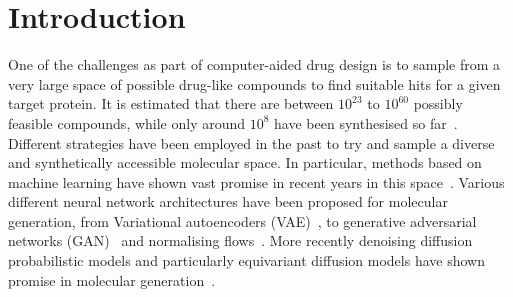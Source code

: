 \documentclass[journal=jacsat,manuscript=article]{achemso}
\begin{document}
\section{Introduction}
\label{sec:intro}
One of the challenges as part of computer-aided drug design is to sample from a very large space of possible drug-like compounds to find suitable hits for a given target protein. It is estimated that there are between $10^{23}$ to $10^{60}$ possibly feasible compounds, while only around $10^8$ have been synthesised so far~\cite{polishchuk2013estimation, reymond2012exploring}. Different strategies have been employed in the past to try and sample a diverse and synthetically accessible molecular space. In particular, methods based on machine learning have shown vast promise in recent years in this space~\cite{bilodeau2022generative}. Various different neural network architectures have been proposed for molecular generation, from Variational autoencoders (VAE)~\cite{kingma2022autoencoding, jin2018junction, ma2018constrained, agoza2022generating}, to generative adversarial networks (GAN)~\cite{hoffmann2019generating} and normalising flows~\cite{shi2021learning}. More recently denoising diffusion probabilistic models and particularly equivariant diffusion models have shown promise in molecular generation~\cite{xu2022geodiff, hoogeboom2022equivariant}.  
\end{document}
